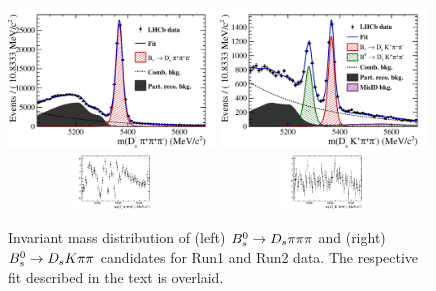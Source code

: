 \begin{figure}[h]
\includegraphics[height=7.cm,width=0.49\textwidth]{figs/norm.pdf}
\includegraphics[height=7.cm,width=0.49\textwidth]{figs/signal.pdf}\\
\includegraphics[width=0.49\textwidth,height=1.5cm]{figs/norm_pull.pdf}
\includegraphics[width=0.49\textwidth,height=1.5cm]{figs/signal_pull.pdf}
\caption{Invariant mass distribution of (left) ${{B}^0_{s}}\rightarrow{\ensuremath{{D}_{s}}}{\ensuremath{\pi}}{\ensuremath{\pi}}{\ensuremath{\pi}}$ and (right) ${{B}^0_{s}}\rightarrow{\ensuremath{{D}_{s}}}{\ensuremath{K}}{\ensuremath{\pi}}{\ensuremath{\pi}}$ candidates for Run1 and Run2 data.
The respective fit described in the text is overlaid.}
\label{fig: BsDsKpipiFit}
\end{figure}

